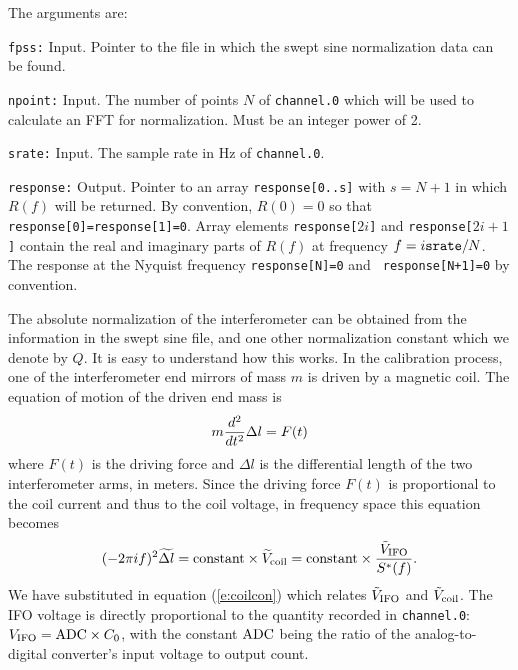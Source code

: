 The arguments are:
\begin{description}
\item{\tt fpss:} Input.  Pointer to the file in which the swept sine normalization
  data can be found.
\item{\tt npoint:} Input.  The number of points $N$ of {\tt channel.0} which will be used
to calculate an FFT for normalization.
Must be an integer power of 2.
\item{\tt srate:}  Input.  The sample rate in Hz of {\tt channel.0}.
\item{\tt response:} Output.  Pointer to an array {\tt response[0..s]}
with $s=N+1$ in which $R(f)$ will be returned.   By convention,
$R(0)=0$ so that {\tt response[0]=response[1]=0}.    Array elements
{\tt response[$2 i$]} and {\tt response[$2 i + 1$]} contain the real and
imaginary parts of $R(f)$ at frequency $f= i{\tt srate}/N$.   The
response at the Nyquist frequency {\tt response[N]=0} and {\tt
response[N+1]=0} by convention.
\end{description}

The absolute normalization of the interferometer can be obtained from
the information in the swept sine file, and one other normalization
constant which we denote by $Q$.  It is easy to understand how this
works.  In the calibration process, one of the interferometer end
mirrors of mass $m$ is driven by a magnetic coil.  The equation of
motion of the driven end mass is
\begin{equation}
m {d^2 \over dt^2} {\Delta l} = F(t)
\end{equation}
where $F(t)$ is the driving force and $\Delta l$ is the differential
length of the two interferometer arms, in meters.  Since the driving
force $F(t)$ is proportional to the coil current and thus to the coil
voltage, in frequency space this equation becomes
\begin{equation}
(- 2 \pi i f)^2 \widetilde{\Delta l}  = {\rm constant} \times \widetilde{V}_{\rm coil} =
{\rm constant} \times {{\tilde V}_{\rm IFO} \over S^*(f)}.
\end{equation}
We have substituted in equation (\ref{e:coilcon}) which relates
${\tilde V}_{\rm IFO}$ and ${\tilde V}_{\rm coil}$.
The IFO voltage is directly proportional to the quantity recorded in 
{\tt channel.0}: $V_{\rm IFO} = {\rm ADC} \times C_0$, with the constant ${\rm ADC}$ 
being the ratio of the analog-to-digital converter's input voltage to
output count.

